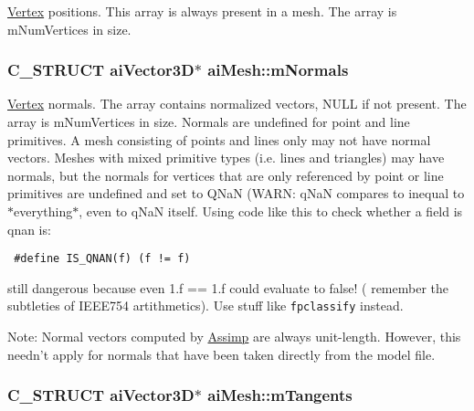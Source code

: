 \hyperlink{struct_vertex}{Vertex} positions. This array is always present in a mesh. The array is mNumVertices in size. \hypertarget{structai_mesh_ec81b496b4d93838cef038933dabe9b9}{
\subsubsection[mNormals]{\setlength{\rightskip}{0pt plus 5cm}C\_\-STRUCT aiVector3D$\ast$ {\bf aiMesh::mNormals}}}
\label{structai_mesh_ec81b496b4d93838cef038933dabe9b9}


\hyperlink{struct_vertex}{Vertex} normals. The array contains normalized vectors, NULL if not present. The array is mNumVertices in size. Normals are undefined for point and line primitives. A mesh consisting of points and lines only may not have normal vectors. Meshes with mixed primitive types (i.e. lines and triangles) may have normals, but the normals for vertices that are only referenced by point or line primitives are undefined and set to QNaN (WARN: qNaN compares to inequal to $\ast$everything$\ast$, even to qNaN itself. Using code like this to check whether a field is qnan is: 

\begin{Code}\begin{verbatim} #define IS_QNAN(f) (f != f)
\end{verbatim}
\end{Code}

 still dangerous because even 1.f == 1.f could evaluate to false! ( remember the subtleties of IEEE754 artithmetics). Use stuff like {\tt fpclassify} instead. \begin{Desc}
\item[Note:]Normal vectors computed by \hyperlink{namespace_assimp}{Assimp} are always unit-length. However, this needn't apply for normals that have been taken directly from the model file. \end{Desc}
\hypertarget{structai_mesh_f367ff78bd69f3e83d7edc8ad67dc5df}{
\subsubsection[mTangents]{\setlength{\rightskip}{0pt plus 5cm}C\_\-STRUCT aiVector3D$\ast$ {\bf aiMesh::mTangents}}}
\label{structai_mesh_f367ff78bd69f3e83d7edc8ad67dc5df}


